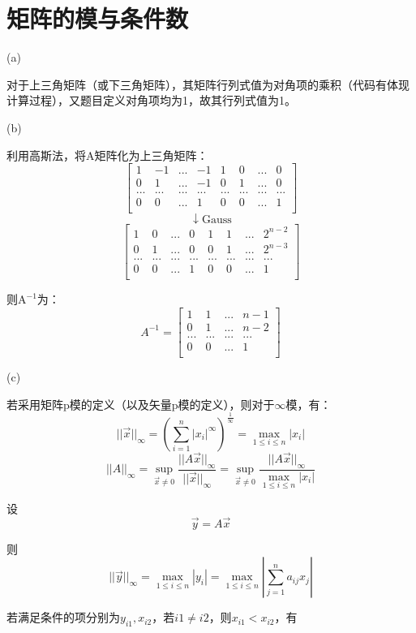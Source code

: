 \documentclass{article}
\begin{document}
\section{矩阵的模与条件数}
(a)\par
对于上三角矩阵（或下三角矩阵），其矩阵行列式值为对角项的乘积（代码有体现计算过程），又题目定义对角项均为1，故其行列式值为1。\par
(b)\par
利用高斯法，将A矩阵化为上三角矩阵：
$$
\begin{bmatrix}
    1 & -1 & ... & -1 & 1 & 0 & ... & 0\\
    0 & 1 & ... & -1 & 0 & 1 & ... & 0\\
    ... & ... & ... & ... & ... & ... & ... & ...\\
    0 & 0 & ... & 1 & 0 & 0 & ... & 1\\
\end{bmatrix}
$$
$$\downarrow \mathrm{Gauss}$$
$$
\begin{bmatrix}
    1 & 0 & ... & 0 & 1 & 1 & ... & 2^{n-2}\\
    0 & 1 & ... & 0 & 0 & 1 & ... & 2^{n-3}\\
    ... & ... & ... & ... & ... & ... & ... & ...\\
    0 & 0 & ... & 1 & 0 & 0 & ... & 1\\
\end{bmatrix}
$$
\par
则$\mathrm{A}^{-1}$为：
$$
A^{-1}=
\begin{bmatrix}
    1 & 1 & ... & n-1\\
    0 & 1 & ... & n-2\\
    ... & ... & ... & ...\\
    0 & 0 & ... & 1\\
\end{bmatrix}
$$
\par
(c)\par
若采用矩阵p模的定义（以及矢量p模的定义），则对于$\infty$模，有：
$$||\vec x||_\infty=\left(\sum_{i=1}^n|x_i|^\infty\right)^{\frac{1}{\infty}}=\max_{1\leq i\leq n}|x_i|$$
$$||A||_\infty=\sup_{\vec x\neq 0}\frac{||A\vec x||_\infty}{||\vec x||_\infty}=\sup_{\vec x\neq 0}\frac{||A\vec x||_\infty}{\max_{1\leq i\leq n}|x_i|}$$
\par
设
$$\vec y=A \vec x$$
\par 
则
$$||\vec y||_\infty=\max_{1\leq i\leq n}|y_i|=\max_{1\leq i\leq n}\left|\sum_{j=1}^n a_{ij}x_j\right|$$
\par
若满足条件的项分别为$y_{i1},x_{i2}$，若$i1\neq i2$，则$x_{i1}<x_{i2}$，有
\end{document}
